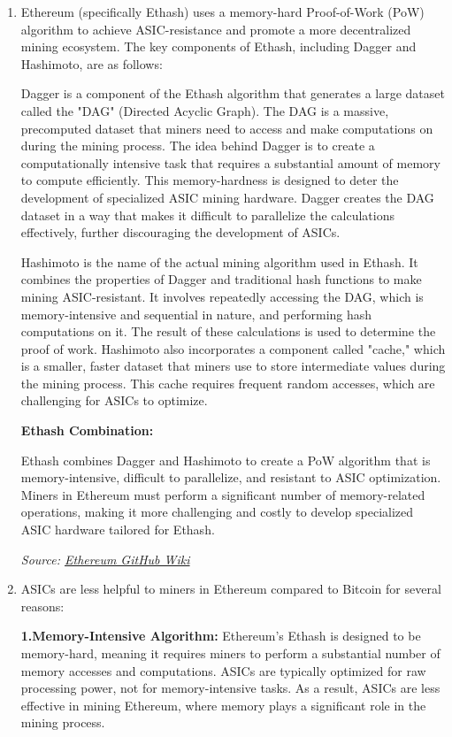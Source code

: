 \documentclass{article}
\begin{document}
\begin{enumerate}
    \item Ethereum (specifically Ethash) uses a memory-hard Proof-of-Work (PoW) algorithm to achieve ASIC-resistance and promote a more decentralized mining ecosystem. The key components of Ethash, including Dagger and Hashimoto, are as follows:

Dagger is a component of the Ethash algorithm that generates a large dataset called the "DAG" (Directed Acyclic Graph). The DAG is a massive, precomputed dataset that miners need to access and make computations on during the mining process.
The idea behind Dagger is to create a computationally intensive task that requires a substantial amount of memory to compute efficiently. This memory-hardness is designed to deter the development of specialized ASIC mining hardware.
Dagger creates the DAG dataset in a way that makes it difficult to parallelize the calculations effectively, further discouraging the development of ASICs.


Hashimoto is the name of the actual mining algorithm used in Ethash. It combines the properties of Dagger and traditional hash functions to make mining ASIC-resistant.
It involves repeatedly accessing the DAG, which is memory-intensive and sequential in nature, and performing hash computations on it. The result of these calculations is used to determine the proof of work.
Hashimoto also incorporates a component called "cache," which is a smaller, faster dataset that miners use to store intermediate values during the mining process. This cache requires frequent random accesses, which are challenging for ASICs to optimize.

\textbf{Ethash Combination:}

Ethash combines Dagger and Hashimoto to create a PoW algorithm that is memory-intensive, difficult to parallelize, and resistant to ASIC optimization.
Miners in Ethereum must perform a significant number of memory-related operations, making it more challenging and costly to develop specialized ASIC hardware tailored for Ethash.

\emph{Source: \href{https://github.com/ethereum/wiki/wiki/Ethash}{Ethereum GitHub Wiki}}

\item ASICs are less helpful to miners in Ethereum compared to Bitcoin for several reasons:

\textbf{1.Memory-Intensive Algorithm:} Ethereum's Ethash is designed to be memory-hard, meaning it requires miners to perform a substantial number of memory accesses and computations. ASICs are typically optimized for raw processing power, not for memory-intensive tasks. As a result, ASICs are less effective in mining Ethereum, where memory plays a significant role in the mining process.


\end{enumerate}
\end{document}
